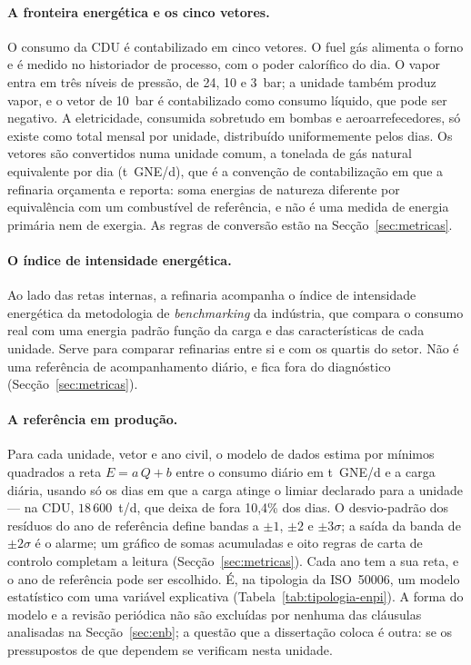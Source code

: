 \paragraph{A fronteira energética e os cinco vetores.} O consumo da CDU é
contabilizado em cinco vetores. O fuel gás alimenta o forno e é medido no
historiador de processo, com o poder calorífico do dia. O vapor entra em três
níveis de pressão, de 24, 10 e 3~bar; a unidade também produz vapor, e o vetor
de 10~bar é contabilizado como consumo líquido, que pode ser negativo. A eletricidade,
consumida sobretudo em bombas e aeroarrefecedores, só existe como total
mensal por unidade, distribuído uniformemente pelos dias. Os vetores são
convertidos numa unidade comum, a tonelada de gás natural equivalente por
dia (t~GNE/d), que é a convenção de contabilização em que a refinaria
orçamenta e reporta: soma energias de natureza diferente por equivalência
com um combustível de referência, e não é uma medida de energia primária nem
de exergia. As regras de conversão estão na Secção~\ref{sec:metricas}.

\paragraph{O índice de intensidade energética.} Ao lado das retas internas, a
refinaria acompanha o índice de intensidade energética da metodologia de
\emph{benchmarking} da indústria, que compara o consumo real com uma energia
padrão função da carga e das características de cada unidade. Serve para
comparar refinarias entre si e com os quartis do setor. Não é uma
referência de acompanhamento diário, e fica fora do diagnóstico
(Secção~\ref{sec:metricas}).

\paragraph{A referência em produção.} Para cada unidade, vetor e ano civil,
o modelo de dados estima por mínimos quadrados a reta $E = a\,Q + b$ entre o
consumo diário em t~GNE/d e a carga diária, usando só os dias em que a carga
atinge o limiar declarado para a unidade --- na CDU, $18\,600$~t/d, que deixa de
fora 10,4\% dos dias. O desvio-padrão dos resíduos do ano de referência
define bandas a $\pm1$, $\pm2$ e $\pm3\sigma$; a saída da banda de $\pm2\sigma$
é o alarme; um gráfico de somas acumuladas e oito regras de carta de controlo
completam a leitura (Secção~\ref{sec:metricas}). Cada ano tem a sua reta, e o
ano de referência pode ser escolhido. É, na tipologia da ISO~50006, um modelo
estatístico com uma variável explicativa (Tabela~\ref{tab:tipologia-enpi}). A
forma do modelo e a revisão periódica não são excluídas por nenhuma das
cláusulas analisadas na Secção~\ref{sec:enb}; a questão que a dissertação
coloca é outra: se os pressupostos de que dependem se verificam nesta unidade.


